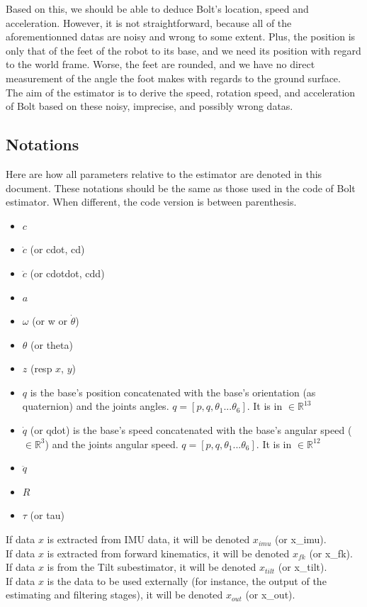 \documentclass[a4paper,10pt]{article}
\begin{document}
Based on this, we should be able to deduce Bolt's location, speed and acceleration. However, it is not straightforward, because all of the aforementionned datas are noisy and wrong to some extent. Plus, the position is only that of the feet of the robot to its base, and we need its position with regard to the world frame. Worse, the feet are rounded, and we have no direct measurement of the angle the foot makes with regards to the ground surface.\\
The aim of the estimator is to derive the speed, rotation speed, and acceleration of Bolt based on these noisy, imprecise, and possibly wrong datas.

\subsection{Notations}
Here are how all parameters relative to the estimator are denoted in this document. These notations should be the same as those used in the code of Bolt estimator. When different, the code version is between parenthesis.
\begin{itemize}[noitemsep,topsep=0.5pt,parsep=0.1pt,partopsep=0.1pt]
	\item $c$
	\item $\dot c$ (or cdot, cd)
	\item $\ddot c$ (or cdotdot, cdd)
	\item $a$
	\item $\omega$ (or w or $\dot \theta$)
	\item $\theta$ (or theta)
	\item $z$ (resp $x$, $y$) 
	\item $q$ is the base's position concatenated with the base's orientation (as quaternion) and the joints angles. $q = [p, q, \theta_1 ... \theta_6]$. It is in $\in\mathbb{R}^{13}$
	\item $\dot q$ (or qdot) is the base's speed concatenated with the base's angular speed ($\in\mathbb{R}^3$) and the joints angular speed. $q = [p, q, \theta_1 ... \theta_6]$. It is in $\in\mathbb{R}^{12}$
	\item $\ddot q$
	\item $R$
	\item $\tau$ (or tau)
\end{itemize}
If data $x$ is extracted from IMU data, it will be denoted $x_{imu}$ (or x\_imu).\\
If data $x$ is extracted from forward kinematics, it will be denoted $x_{fk}$ (or x\_fk).\\
If data $x$ is from the Tilt subestimator, it will be denoted $x_{tilt}$ (or x\_tilt).\\
If data $x$ is the data to be used externally (for instance, the output of the estimating and filtering stages), it will be denoted $x_{out}$ (or x\_out).\\
\end{document}
